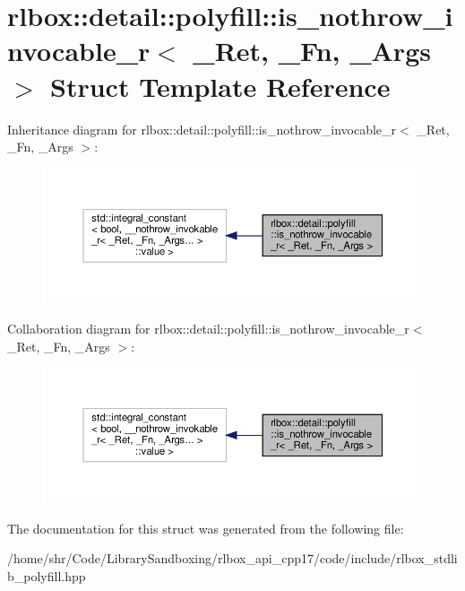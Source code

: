 \hypertarget{structrlbox_1_1detail_1_1polyfill_1_1is__nothrow__invocable__r}{}\section{rlbox\+:\+:detail\+:\+:polyfill\+:\+:is\+\_\+nothrow\+\_\+invocable\+\_\+r$<$ \+\_\+\+Ret, \+\_\+\+Fn, \+\_\+\+Args $>$ Struct Template Reference}
\label{structrlbox_1_1detail_1_1polyfill_1_1is__nothrow__invocable__r}


Inheritance diagram for rlbox\+:\+:detail\+:\+:polyfill\+:\+:is\+\_\+nothrow\+\_\+invocable\+\_\+r$<$ \+\_\+\+Ret, \+\_\+\+Fn, \+\_\+\+Args $>$\+:
\nopagebreak
\begin{figure}[H]
\begin{center}
\leavevmode
\includegraphics[width=350pt]{structrlbox_1_1detail_1_1polyfill_1_1is__nothrow__invocable__r__inherit__graph}
\end{center}
\end{figure}


Collaboration diagram for rlbox\+:\+:detail\+:\+:polyfill\+:\+:is\+\_\+nothrow\+\_\+invocable\+\_\+r$<$ \+\_\+\+Ret, \+\_\+\+Fn, \+\_\+\+Args $>$\+:
\nopagebreak
\begin{figure}[H]
\begin{center}
\leavevmode
\includegraphics[width=350pt]{structrlbox_1_1detail_1_1polyfill_1_1is__nothrow__invocable__r__coll__graph}
\end{center}
\end{figure}


The documentation for this struct was generated from the following file\+:\begin{DoxyCompactItemize}
\item 
/home/shr/\+Code/\+Library\+Sandboxing/rlbox\+\_\+api\+\_\+cpp17/code/include/rlbox\+\_\+stdlib\+\_\+polyfill.\+hpp\end{DoxyCompactItemize}
